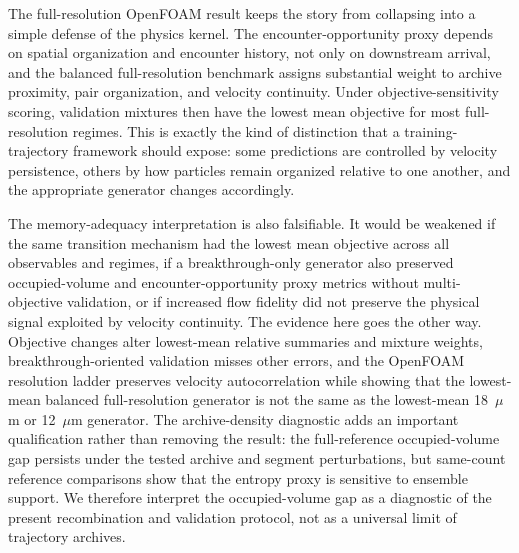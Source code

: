 \documentclass[11pt]{article}
\begin{document}
The full-resolution OpenFOAM result keeps the story from collapsing into a simple defense of the physics kernel. The encounter-opportunity proxy depends on spatial organization and encounter history, not only on downstream arrival, and the balanced full-resolution benchmark assigns substantial weight to archive proximity, pair organization, and velocity continuity. Under objective-sensitivity scoring, validation mixtures then have the lowest mean objective for most full-resolution regimes. This is exactly the kind of distinction that a training-trajectory framework should expose: some predictions are controlled by velocity persistence, others by how particles remain organized relative to one another, and the appropriate generator changes accordingly.

The memory-adequacy interpretation is also falsifiable. It would be weakened if the same transition mechanism had the lowest mean objective across all observables and regimes, if a breakthrough-only generator also preserved occupied-volume and encounter-opportunity proxy metrics without multi-objective validation, or if increased flow fidelity did not preserve the physical signal exploited by velocity continuity. The evidence here goes the other way. Objective changes alter lowest-mean relative summaries and mixture weights, breakthrough-oriented validation misses other errors, and the OpenFOAM resolution ladder preserves velocity autocorrelation while showing that the lowest-mean balanced full-resolution generator is not the same as the lowest-mean 18~$\mu$m or 12~$\mu$m generator. The archive-density diagnostic adds an important qualification rather than removing the result: the full-reference occupied-volume gap persists under the tested archive and segment perturbations, but same-count reference comparisons show that the entropy proxy is sensitive to ensemble support. We therefore interpret the occupied-volume gap as a diagnostic of the present recombination and validation protocol, not as a universal limit of trajectory archives.
\end{document}
